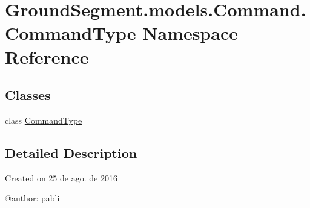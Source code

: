 \hypertarget{namespace_ground_segment_1_1models_1_1_command_1_1_command_type}{}\section{Ground\+Segment.\+models.\+Command.\+Command\+Type Namespace Reference}
\label{namespace_ground_segment_1_1models_1_1_command_1_1_command_type}
\subsection*{Classes}
\begin{DoxyCompactItemize}
\item 
class \hyperlink{class_ground_segment_1_1models_1_1_command_1_1_command_type_1_1_command_type}{Command\+Type}
\end{DoxyCompactItemize}


\subsection{Detailed Description}
\begin{DoxyVerb}Created on 25 de ago. de 2016

@author: pabli
\end{DoxyVerb}
 